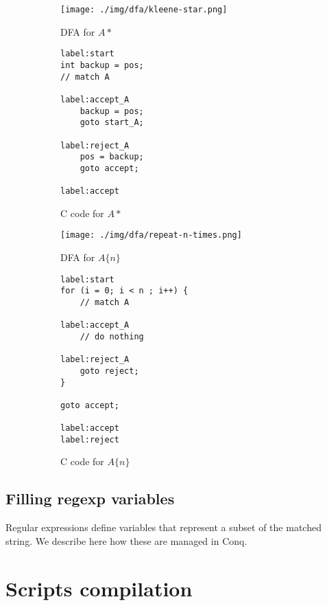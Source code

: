 \documentclass[11pt,a4paper]{report}
\newcommand{\regexp}[1]{$#1$}
\begin{document}
\begin{figure}[h!]
	\begin{subfigure}[h]{0.45\textwidth}
		\centering
		\texttt{[image: ./img/dfa/kleene-star.png]}
		\caption{DFA for \regexp{A*}}
	\end{subfigure}
	\hspace{0.05\textwidth}
	\begin{subfigure}[h]{0.45\textwidth}
		\centering
		\begin{lstlisting}[style=C]
label:start
int backup = pos;
// match A

label:accept_A
	backup = pos;
	goto start_A;

label:reject_A
	pos = backup;
	goto accept;

label:accept
		\end{lstlisting}
		\caption{C code for \regexp{A*}}
	\end{subfigure}
	\caption{}
\end{figure}

\begin{figure}[h!]
	\begin{subfigure}[h]{0.45\textwidth}
		\centering
		\texttt{[image: ./img/dfa/repeat-n-times.png]}
		\caption{DFA for \regexp{A\{n\}}}
	\end{subfigure}
	\hspace{0.05\textwidth}
	\begin{subfigure}[h]{0.45\textwidth}
		\centering
		\begin{lstlisting}[style=C]
label:start
for (i = 0; i < n ; i++) {
	// match A

label:accept_A
	// do nothing

label:reject_A
	goto reject;
}

goto accept;

label:accept
label:reject
		\end{lstlisting}
		\caption{C code for \regexp{A\{n\}}}
	\end{subfigure}
	\caption{}
	\label{dfatoc-ntimes}
\end{figure}

\section{Filling regexp variables}

Regular expressions define variables that represent a subset of the matched string. We describe here how these are managed in Conq.

\chapter{Scripts compilation}
\end{document}
